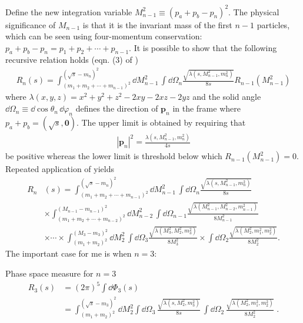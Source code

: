 Define the new integration variable $M_{n-1}^2 \equiv (p_a + p_b - p_n)^2$. The physical significance of $M_{n-1}$ is that it is the invariant mass of the first $n-1$ particles, which can be seen using four-momentum conservation: $p_a + p_b - p_n = p_1 + p_2 + \cdots + p_{n-1}$.
It is possible to show that the following recursive relation holds (eqn. (3) of \cite{Byckling:1969sx})
\begin{align}
    \label{eq:recursive-phase-space-relation}
    R_n(s) = 
    \int_{(m_1 + m_2 + \cdots + m_{n-1})^2}^{(\sqrt{s} - m_n)^2} 
    \dd M^2_{n-1} \, \int \dd \Omega_n
    \frac{\sqrt{\lambda(s, M_{n-1}^2, m_n^2)}}{8s} R_{n-1}(M_{n-1}^2)
\end{align}
where $\lambda(x, y, z) = x^2 + y^2 + z^2 - 2 xy - 2 xz - 2yz$ and the solid angle $\dd \Omega_n \equiv \dd \cos \theta_n\, \dd \varphi_n$ defines the direction of $\bm{p}_n$ in the frame where $p_a + p_b = (\sqrt{s}, \bm{0})$. 
The upper limit is obtained by requiring that 
\begin{align}
    |\bm{p}_n|^2 = \frac{\lambda(s, M_{n-1}^2, m_n^2)}{4 s}
\end{align}
be positive whereas the lower limit is threshold below which $R_{n-1}(M_{n-1}^2) = 0$\footnotemark. 
Repeated application of  yields 
\begin{equation}
\begin{aligned}
    R_n&(s) 
        = 
    \int_{(m_1 + m_2 + \cdots + m_{n-1})^2}^{(\sqrt{s} - m_n)^2}
    \dd M^2_{n-1} \,  \int \dd \Omega_n
    \frac{\sqrt{\lambda(s, M_{n-1}^2, m_n^2)}}{8s} \\
        &\times 
    \int_{(m_1 + m_2 + \cdots + m_{n-2})^2}^{(M_{n-1} - m_{n-1})^2}
    \dd M^2_{n-2}  \, \int \dd \Omega_{n-1}
    \frac{\sqrt{\lambda(M_{n-1}^2, M_{n-2}^2, m_{n-1}^2)}}{8M_{n-1}^2} \\
        &\times \cdots \times
    \int_{(m_1 + m_2)^2}^{(M_3 - m_3)^2}
    \dd M^2_{2}  \, \int \dd \Omega_{3}
    \frac{\sqrt{\lambda(M_{3}^2, M_{2}^2, m_{3}^2)}}{8M_{3}^2} 
    \times 
    \int \dd \Omega_2
    \frac{\sqrt{\lambda(M_{2}^2, m_1^2, m_{2}^2)}}{8M_{2}^2}. 
\end{aligned}
\end{equation}
\newpage
The important case for me is when $n = 3$:
\begin{bluenv}{Phase space measure for $n = 3$}
    \vspace{-3ex}
    \begin{equation}
        \label{eq:recursive-LIPS-3}
    \begin{aligned}
        R_3(s) &= (2\pi)^{5}\int \dd \Phi_3(s) \\
            &= 
            \int_{(m_1 + m_2)^2}^{(\sqrt{s} - m_3)^2} \dd M_{2}^2 
            \int \dd \Omega_3 \,
            \frac{\sqrt{\lambda (s, M^2_{2}, m_3^2)}}{8s} \,
            \int \dd \Omega_2 \,
            \frac{\sqrt{\lambda (M^2_2, m_1^2, m_2^2)}}{8 M_2^2} \; .
    \end{aligned}
    \end{equation}
\end{bluenv}

